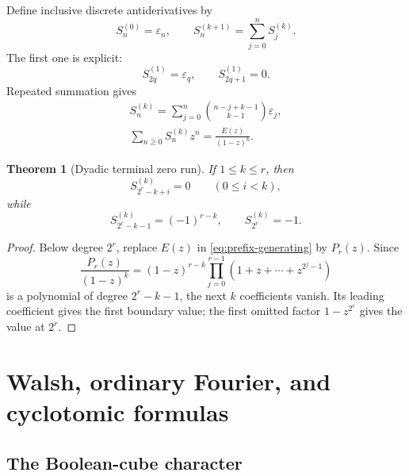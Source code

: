 \documentclass[11pt,oneside]{article}
\numberwithin{equation}{section}
\newtheorem{theorem}{Theorem}[section]
\theoremstyle{definition}
\theoremstyle{remark}
\newcommand{\eps}{\varepsilon}
\begin{document}
Define inclusive discrete antiderivatives by
\begin{equation}
 S_n^{(0)}=\eps_n,
 \qquad
 S_n^{(k+1)}=\sum_{j=0}^nS_j^{(k)}.
 \label{eq:iterated-prefix-def}
\end{equation}
The first one is explicit:
\begin{equation}
 S_{2q}^{(1)}=\eps_q,
 \qquad
 S_{2q+1}^{(1)}=0.
 \label{eq:first-prefix}
\end{equation}
Repeated summation gives
\begin{align}
 \boxed{S_n^{(k)}=
 \sum_{j=0}^n\binom{n-j+k-1}{k-1}\eps_j,}
 \label{eq:prefix-binomial-convolution}\\
 \boxed{\sum_{n\ge0}S_n^{(k)}z^n=\frac{E(z)}{(1-z)^k}.}
 \label{eq:prefix-generating}
\end{align}

\begin{theorem}[Dyadic terminal zero run]
If \(1\le k\le r\), then
\begin{equation}
 S_{2^r-k+i}^{(k)}=0\qquad(0\le i<k),
 \label{eq:terminal-zero-run}
\end{equation}
while
\begin{equation}
 S_{2^r-k-1}^{(k)}=(-1)^{r-k},
 \qquad
 S_{2^r}^{(k)}=-1.
 \label{eq:prefix-boundaries}
\end{equation}
\end{theorem}

\begin{proof}
Below degree \(2^r\), replace \(E(z)\) in
\eqref{eq:prefix-generating} by \(P_r(z)\).  Since
\[
 \frac{P_r(z)}{(1-z)^k}
 =(1-z)^{r-k}\prod_{j=0}^{r-1}(1+z+\cdots+z^{2^j-1})
\]
is a polynomial of degree \(2^r-k-1\), the next \(k\) coefficients vanish.
Its leading coefficient gives the first boundary value; the first omitted
factor \(1-z^{2^r}\) gives the value at \(2^r\).
\end{proof}

\section{Walsh, ordinary Fourier, and cyclotomic formulas}
\label{sec:fourier}

\subsection{The Boolean-cube character}
\end{document}
